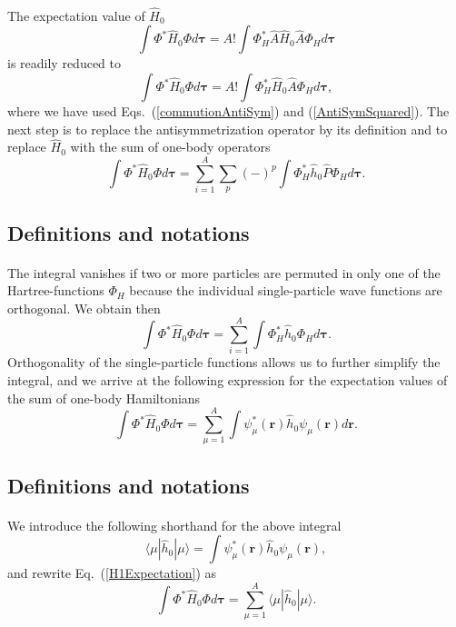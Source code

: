 \documentclass[%
twoside,                 %
final,                   %
10pt]{article}
\begin{document}
\paragraph{}
The expectation value of $\hat{H}_0$ 
\[
  \int \Phi^*\hat{H}_0\Phi d\mathbf{\tau} 
  = A! \int \Phi_H^*\hat{A}\hat{H}_0\hat{A}\Phi_H d\mathbf{\tau}
\]
is readily reduced to
\[
  \int \Phi^*\hat{H}_0\Phi d\mathbf{\tau} 
  = A! \int \Phi_H^*\hat{H}_0\hat{A}\Phi_H d\mathbf{\tau},
\]
where we have used Eqs.~(\ref{commutionAntiSym}) and
(\ref{AntiSymSquared}). The next step is to replace the antisymmetrization
operator by its definition and to
replace $\hat{H}_0$ with the sum of one-body operators
\[
  \int \Phi^*\hat{H}_0\Phi  d\mathbf{\tau}
  = \sum_{i=1}^A \sum_{p} (-)^p\int 
  \Phi_H^*\hat{h}_0\hat{P}\Phi_H d\mathbf{\tau}.
\]



\subsection*{Definitions and notations}

\paragraph{}
The integral vanishes if two or more particles are permuted in only one
of the Hartree-functions $\Phi_H$ because the individual single-particle wave functions are
orthogonal. We obtain then
\[
  \int \Phi^*\hat{H}_0\Phi  d\mathbf{\tau}= \sum_{i=1}^A \int \Phi_H^*\hat{h}_0\Phi_H  d\mathbf{\tau}.
\]
Orthogonality of the single-particle functions allows us to further simplify the integral, and we
arrive at the following expression for the expectation values of the
sum of one-body Hamiltonians 
\begin{equation}
  \int \Phi^*\hat{H}_0\Phi  d\mathbf{\tau}
  = \sum_{\mu=1}^A \int \psi_{\mu}^*(\mathbf{r})\hat{h}_0\psi_{\mu}(\mathbf{r})
  d\mathbf{r}.
  \label{H1Expectation}
\end{equation}



\subsection*{Definitions and notations}

\paragraph{}
We introduce the following shorthand for the above integral
\[
\langle \mu | \hat{h}_0 | \mu \rangle = \int \psi_{\mu}^*(\mathbf{r})\hat{h}_0\psi_{\mu}(\mathbf{r}),
\]
and rewrite Eq.~(\ref{H1Expectation}) as
\begin{equation}
  \int \Phi^*\hat{H}_0\Phi  d\mathbf{\tau}
  = \sum_{\mu=1}^A \langle \mu | \hat{h}_0 | \mu \rangle.
  \label{H1Expectation1}
\end{equation}
\end{document}
